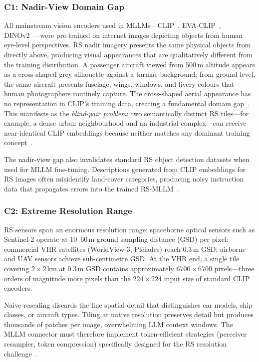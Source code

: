 \subsubsection{C1: Nadir-View Domain Gap}\label{sec2:nadirview}

All mainstream vision encoders used in MLLMs---CLIP~\cite{clip2021},
EVA-CLIP~\cite{fang2023evaclip}, DINOv2~\cite{oquab2023dinov2}---were
pre-trained on internet images depicting objects from human eye-level
perspectives. RS nadir imagery presents the same physical objects from
directly above, producing visual appearances that are qualitatively different
from the training distribution. A passenger aircraft viewed from 500\,m altitude
appears as a cross-shaped grey silhouette against a tarmac background; from
ground level, the same aircraft presents fuselage, wings, windows, and livery
colours that human photographers routinely capture. The cross-shaped aerial
appearance has no representation in CLIP's training data, creating a fundamental
domain gap~\cite{long2021creating}. This manifests as the \emph{blind-pair
problem}: two semantically distinct RS tiles---for example, a dense urban
neighbourhood and an industrial complex---can receive near-identical CLIP
embeddings because neither matches any dominant training concept~\cite{bommasani2021}.

The nadir-view gap also invalidates standard RS object detection datasets
when used for MLLM fine-tuning. Descriptions generated from CLIP embeddings
for RS images often misidentify land-cover categories, producing noisy
instruction data that propagates errors into the trained
RS-MLLM~\cite{ddfav2025}.

\subsubsection{C2: Extreme Resolution Range}\label{sec2:resolution}

RS sensors span an enormous resolution range: spaceborne optical sensors such
as Sentinel-2 operate at 10--60\,m ground sampling distance (GSD) per pixel;
commercial VHR satellites (WorldView-3, Pl{\'e}iades) reach 0.3\,m GSD; airborne
and UAV sensors achieve sub-centimetre GSD. At the VHR end, a single tile
covering $2\!\times\!2$\,km at 0.3\,m GSD contains approximately
$6700\!\times\!6700$ pixels---three orders of magnitude more pixels than the
$224\!\times\!224$ input size of standard CLIP encoders.

Naive rescaling discards the fine spatial detail that distinguishes car models,
ship classes, or aircraft types. Tiling at native resolution preserves detail
but produces thousands of patches per image, overwhelming LLM context windows.
The MLLM connector must therefore implement token-efficient strategies (perceiver
resampler, token compression) specifically designed for the RS resolution
challenge~\cite{uhrbat2025, geollava2025}.

